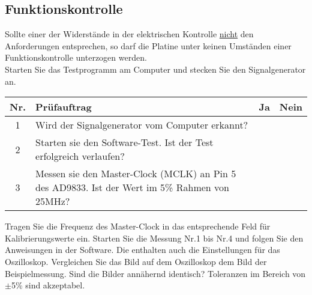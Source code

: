 \subsection{Funktionskontrolle}
Sollte einer der Widerstände in der elektrischen Kontrolle \underline{nicht} den Anforderungen entsprechen, so darf die Platine unter keinen Umständen einer Funktionskontrolle unterzogen werden.\\
Starten Sie das Testprogramm am Computer und stecken Sie den Signalgenerator an.
\begin{flushleft}
	\begin{tabular}{|c||p{10cm}|c|c|}
		\hline
		Nr. & Prüfauftrag & Ja & Nein\\
		\hline
		1 & Wird der Signalgenerator vom Computer erkannt? & & \\
		\hline
		2 & Starten sie den Software-Test. Ist der Test erfolgreich verlaufen? & & \\
		\hline
		3 & Messen sie den Master-Clock (MCLK) an Pin 5 des AD9833. Ist der Wert im 5\% Rahmen von 25MHz? & & \\
		\hline
	\end{tabular}
\end{flushleft}
Tragen Sie die Frequenz des Master-Clock in das entsprechende Feld für Kalibrierungswerte ein.
\medskip		
Starten Sie die Messung Nr.1 bis Nr.4 und folgen Sie den Anweisungen in der Software. Die enthalten auch die Einstellungen für das Oszilloskop. Vergleichen Sie das Bild auf dem Oszilloskop dem Bild der Beispielmessung. Sind die Bilder annähernd identisch? Toleranzen im Bereich von $\pm$5\% sind akzeptabel.


